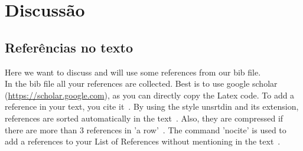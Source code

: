 \clearpage

\chapter{\textbf{Discussão}}\label{discussion}
\section{Referências no texto}
Here we want to discuss and will use some references from our bib file. \\
In the bib file all your references are collected. Best is to use google scholar (\url{https://scholar.google.com}), as you can directly copy the Latex code. To add a reference in your text, you cite it~\cite{Amini12}. By using the style unsrtdin and its extension, references are sorted automatically in the text~\cite{Amini12,Bajpai12}. Also, they are compressed if there are more than 3 references in 'a row'~\cite{Carpenter79,Davis11,Eurotransplant17,Falcone93}. The command 'nocite' is used to add a references to your List of References without mentioning in the text~\nocite{website:chick}.

